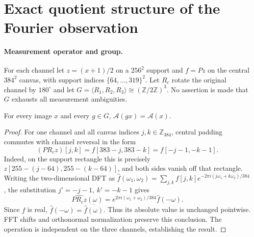 
\section{Exact quotient structure of the Fourier observation}
\label{app:exact-quotient}

\paragraph{Measurement operator and group.}
For each channel let \(z=(x+1)/2\) on a \(256^2\) support and
\(f=Pz\) on the central \(384^2\) canvas, with support indices
\(\{64,\ldots,319\}^2\).
Let \(R_c\) rotate the original channel by \(180^\circ\) and
let \(G=\langle R_1,R_2,R_3\rangle\cong(\mathbb Z/2\mathbb Z)^3\).
No assertion is made that \(G\) exhausts all measurement ambiguities.

\begin{lemma}
\label{lem:th1-orbit}
For every image \(x\) and every \(g\in G\),
\(\mathcal A(gx)=\mathcal A(x)\).
\end{lemma}
\begin{proof}
For one channel and all canvas indices \(j,k\in\mathbb Z_{384}\),
central padding commutes with channel reversal in the form
\[
 (P R_c z)[j,k]=f[383-j,383-k]=f[-j-1,-k-1].
\]
Indeed, on the support rectangle this is precisely
\(z[255-(j-64),255-(k-64)]\), and both sides vanish off that rectangle.
Writing the two-dimensional DFT as
\(\widehat f(\omega_1,\omega_2)=
\sum_{j,k}f[j,k]e^{-2\pi i(j\omega_1+k\omega_2)/384}\),
the substitution \(j'=-j-1,\ k'=-k-1\) gives
\[
 \widehat{P R_c z}(\omega)
 =e^{2\pi i(\omega_1+\omega_2)/384}
   \widehat f(-\omega).
\]
Since \(f\) is real, \(\widehat f(-\omega)=\overline{\widehat f(\omega)}\).
Thus its absolute value is unchanged pointwise. FFT shifts and
orthonormal normalization preserve this conclusion. The operation is
independent on the three channels, establishing the result.
\end{proof}

